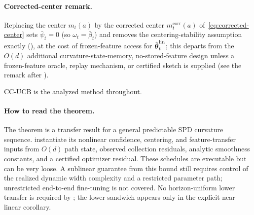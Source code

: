 \documentclass[twoside]{article}
\begin{document}
\paragraph{Corrected-center remark.}
Replacing the center $m_t(a)$ by the corrected center
$m_t^{\mathrm{corr}}(a)$ of~\eqref{eq:corrected-center} sets $\bar\psi_t=0$
(so $\omega_t=\bar\beta_t$) and removes the centering-stability assumption
exactly (), at the cost of frozen-feature access for
$\hat{\boldsymbol{\theta}}_t^{\mathrm{lin}}$; this departs from the $O(d)$ additional
curvature-state-memory,
no-stored-feature design unless a frozen-feature oracle, replay mechanism, or
certified sketch is supplied (see the remark after
).

CC-UCB is the analyzed method throughout.



\paragraph{How to read the theorem.}
The theorem is a transfer result for a general predictable SPD curvature
sequence.   instantiate its
nonlinear confidence, centering, and feature-transfer inputs from $O(d)$ path
state, observed collection residuals, analytic smoothness constants, and a
certified optimizer residual.  These schedules are executable but can be very
loose.  A sublinear guarantee from this bound still requires control of the realized dynamic width
complexity and a restricted parameter path; unrestricted end-to-end fine-tuning
is not covered.  No horizon-uniform lower transfer is required by
; the lower sandwich appears only in the explicit near-linear
corollary.
\end{document}
